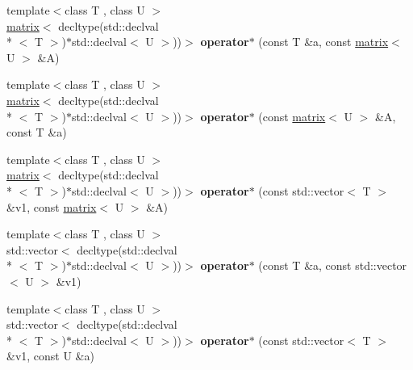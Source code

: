\begin{DoxyCompactItemize}
\item 
\hypertarget{namespacekeycpp_a8d5dbf37b71d16d686dd0fdbad82f8fb}{{\footnotesize template$<$class T , class U $>$ }\\\hyperlink{classkeycpp_1_1matrix}{matrix}$<$ decltype(std\-::declval\\*
$<$ T $>$)$\ast$std\-::declval$<$ U $>$))$>$ {\bfseries operator$\ast$} (const T \&a, const \hyperlink{classkeycpp_1_1matrix}{matrix}$<$ U $>$ \&A)}\label{namespacekeycpp_a8d5dbf37b71d16d686dd0fdbad82f8fb}

\item 
\hypertarget{namespacekeycpp_ae187563f8f86e256bc1394edcba1b2b1}{{\footnotesize template$<$class T , class U $>$ }\\\hyperlink{classkeycpp_1_1matrix}{matrix}$<$ decltype(std\-::declval\\*
$<$ T $>$)$\ast$std\-::declval$<$ U $>$))$>$ {\bfseries operator$\ast$} (const \hyperlink{classkeycpp_1_1matrix}{matrix}$<$ U $>$ \&A, const T \&a)}\label{namespacekeycpp_ae187563f8f86e256bc1394edcba1b2b1}

\item 
\hypertarget{namespacekeycpp_a6dcf10b0db68d53d126803e8d6d591fb}{{\footnotesize template$<$class T , class U $>$ }\\\hyperlink{classkeycpp_1_1matrix}{matrix}$<$ decltype(std\-::declval\\*
$<$ T $>$)$\ast$std\-::declval$<$ U $>$))$>$ {\bfseries operator$\ast$} (const std\-::vector$<$ T $>$ \&v1, const \hyperlink{classkeycpp_1_1matrix}{matrix}$<$ U $>$ \&A)}\label{namespacekeycpp_a6dcf10b0db68d53d126803e8d6d591fb}

\item 
\hypertarget{namespacekeycpp_a4b523ff3dd5abac240788f6efb2e554e}{{\footnotesize template$<$class T , class U $>$ }\\std\-::vector$<$ decltype(std\-::declval\\*
$<$ T $>$)$\ast$std\-::declval$<$ U $>$))$>$ {\bfseries operator$\ast$} (const T \&a, const std\-::vector$<$ U $>$ \&v1)}\label{namespacekeycpp_a4b523ff3dd5abac240788f6efb2e554e}

\item 
\hypertarget{namespacekeycpp_aa2e9a06b12f7df18005a3daa3c051b2c}{{\footnotesize template$<$class T , class U $>$ }\\std\-::vector$<$ decltype(std\-::declval\\*
$<$ T $>$)$\ast$std\-::declval$<$ U $>$))$>$ {\bfseries operator$\ast$} (const std\-::vector$<$ T $>$ \&v1, const U \&a)}\label{namespacekeycpp_aa2e9a06b12f7df18005a3daa3c051b2c}


\end{DoxyCompactItemize}
